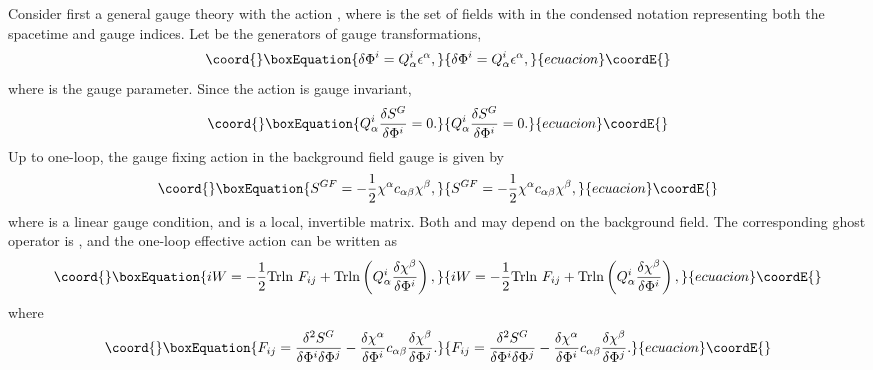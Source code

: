 \documentclass[a4paper,aps,preprint,groupedaddress,showpacs]{revtex4}
\begin{document}
Consider first a general gauge theory with the action
\coordHE{}, where \coordHE{} is the set of fields with 
\coordHE{} in the condensed notation representing both the spacetime
and gauge indices. Let \coordHE{} be the generators of
gauge transformations, 
\begin{equation}\coord{}\boxEquation{
\delta\Phi^{i}=Q^{i}_{\alpha}\epsilon^{\alpha},
}{
\delta\Phi^{i}=Q^{i}_{\alpha}\epsilon^{\alpha},
}{ecuacion}\coordE{}\end{equation}
where \myHighlight{$\epsilon^{\alpha}$}\coordHE{} is the gauge parameter. Since the
action \coordHE{} is gauge invariant,
\begin{equation}\coord{}\boxEquation{
Q^{i}_{\alpha}\frac{\delta S^{G}}{\delta\Phi^{i}}=0.
\label{gauge}
}{
Q^{i}_{\alpha}\frac{\delta S^{G}}{\delta\Phi^{i}}=0.
}{ecuacion}\coordE{}\end{equation}
Up to one-loop, the gauge fixing action in the background field
gauge is given by 
\begin{equation}\coord{}\boxEquation{
S^{GF}=-\frac{1}{2}\chi^{\alpha}c_{\alpha\beta}\chi^{\beta},
}{
S^{GF}=-\frac{1}{2}\chi^{\alpha}c_{\alpha\beta}\chi^{\beta},
}{ecuacion}\coordE{}\end{equation}
where \myHighlight{$\chi^{\alpha}$}\coordHE{} is a linear gauge condition, and
\coordHE{} is a local, invertible matrix. Both 
\myHighlight{$\chi^{\alpha}$}\coordHE{} and \coordHE{} may depend on the
background field. The corresponding ghost operator is 
\coordHE{}, and
the one-loop effective action can be written as
\begin{equation}\coord{}\boxEquation{
iW=-\frac{1}{2}{\rm Trln\ }F_{ij}+
{\rm Trln}\left(Q^{i}_{\alpha}
\frac{\delta\chi^{\beta}}{\delta\Phi^{i}}\right),
\label{EA}
}{
iW=-\frac{1}{2}{\rm Trln\ }F_{ij}+
{\rm Trln}\left(Q^{i}_{\alpha}
\frac{\delta\chi^{\beta}}{\delta\Phi^{i}}\right),
}{ecuacion}\coordE{}\end{equation}
where 
\begin{equation}\coord{}\boxEquation{
F_{ij}=\frac{\delta^{2}S^{G}}{\delta\Phi^{i}\delta\Phi^{j}}-
\frac{\delta\chi^{\alpha}}{\delta\Phi^{i}}c_{\alpha\beta}
\frac{\delta\chi^{\beta}}{\delta\Phi^{j}}.
}{
F_{ij}=\frac{\delta^{2}S^{G}}{\delta\Phi^{i}\delta\Phi^{j}}-
\frac{\delta\chi^{\alpha}}{\delta\Phi^{i}}c_{\alpha\beta}
\frac{\delta\chi^{\beta}}{\delta\Phi^{j}}.
}{ecuacion}\coordE{}\end{equation}
\end{document}
